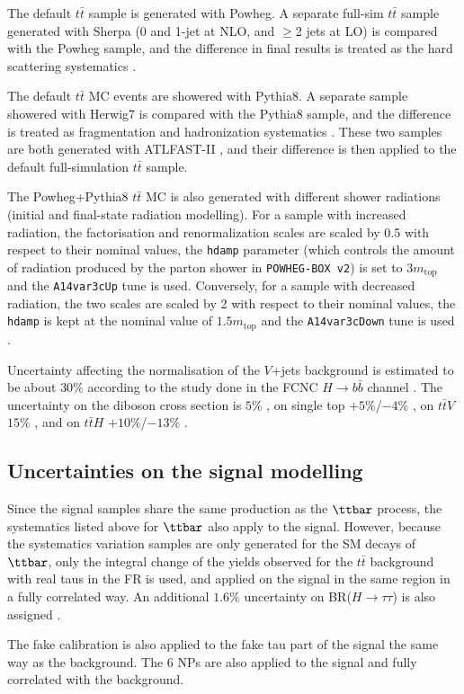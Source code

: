 The default $t\bar{t}$ sample is generated with Powheg. A separate full-sim $t\bar{t}$ sample generated with Sherpa (0 and 1-jet at NLO, and $\ge$2 jets at LO) is compared with the Powheg sample, and the difference in final results is treated as the hard scattering systematics \cite{ttbarSys}.

The default $t\bar{t}$ MC events are showered with Pythia8. A separate sample showered with Herwig7 is compared with the Pythia8 sample, and the difference is treated as fragmentation and hadronization systematics \cite{ttbarSys}. These two samples are both generated with ATLFAST-II \cite{AFII}, and their difference is then applied to the default full-simulation $t\bar{t}$ sample.

The Powheg+Pythia8 $t\bar{t}$ MC is also generated with different shower radiations (initial and final-state radiation modelling). For a sample with increased radiation, the factorisation and renormalization scales are scaled by 0.5 with respect to their nominal values, the \texttt{hdamp} parameter (which controls the amount of radiation produced by the parton shower in \texttt{POWHEG-BOX v2}) is set to $3 m_{\text{top}}$ and the \texttt{A14var3cUp} tune is used. Conversely, for a sample with decreased radiation, the two scales are scaled by 2 with respect to their nominal values, the \texttt{hdamp} is kept at the nominal value of $1.5 m_{\text{top}}$ and the \texttt{A14var3cDown} tune is used \cite{ttbarSys}.

Uncertainty affecting the normalisation of the $V$+jets background is estimated to be about $30\%$ according to the study done in the FCNC $H\to b\bar{b}$ channel \cite{FCNC_Hbb}. The uncertainty on the diboson cross section is $5\%$ \cite{VV_uncert}, on single top $+5\%$/$-4\%$ \cite{WtXsec}\cite{st_uncert_1,st_uncert_2}, on $t\bar{t}V$ $15\%$ \cite{ttV_uncert_1,ttV_uncert_2}, and on $t\bar{t}H$ $+10\%$/$-13\%$ \cite{ttH_uncert}.

\subsection{Uncertainties on the signal modelling}

Since the signal samples share the same production as the $\ttbar$ process, the systematics listed above for $\ttbar$ also apply to the signal. However, because the systematics variation samples are only generated for the SM decays of $\ttbar$, only the integral change of the yields observed for the $t\bar{t}$ background with real taus in the FR is used, and applied on the signal in the same region in a fully correlated way. An additional $1.6\%$ uncertainty on BR($H\to\tau\tau$) is also assigned \cite{HiggsBR}.

The fake calibration is also applied to the fake tau part of the signal the same way as the background. The 6 NPs are also applied to the signal and fully correlated with the background.